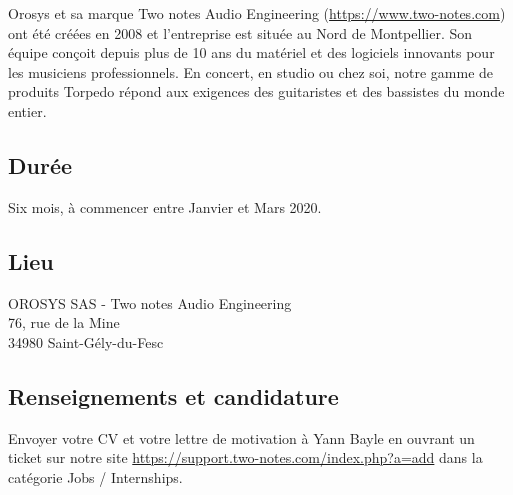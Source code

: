 \documentclass[12pt, a4paper]{article}
\begin{document}
Orosys et sa marque Two notes Audio Engineering (\url{https://www.two-notes.com}) ont été créées en 2008 et l'entreprise est située au Nord de Montpellier.
Son équipe conçoit depuis plus de 10 ans du matériel et des logiciels innovants pour les musiciens professionnels.
En concert, en studio ou chez soi, notre gamme de produits Torpedo répond aux exigences des guitaristes et des bassistes du monde entier. 

\subsection*{Durée}

Six mois, à commencer entre Janvier et Mars 2020.

\subsection*{Lieu}

OROSYS SAS - Two notes Audio Engineering \\
76, rue de la Mine \\
34980 Saint-Gély-du-Fesc

\subsection*{Renseignements et candidature}

Envoyer votre CV et votre lettre de motivation à Yann Bayle en ouvrant un ticket sur notre site \url{https://support.two-notes.com/index.php?a=add} dans la catégorie Jobs / Internships.
\end{document}
